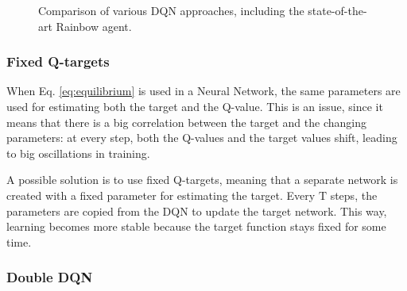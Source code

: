 \documentclass[a4paper, 12pt]{article}
\numberwithin{equation}{section}
\begin{document}
\begin{figure}[h]
	\centering
		\caption{Comparison of various DQN approaches, including the state-of-the-art Rainbow agent.}
	\label{fig:rainbow}
\end{figure}



\subsubsection{Fixed Q-targets}

When Eq. \eqref{eq:equilibrium} is used in a Neural Network, the same parameters are used for estimating both the target and the Q-value. This is an issue, since it means that there is a big correlation between the target and the changing parameters: at every step, both the Q-values and the target values shift, leading to big oscillations in training.

A possible solution is to use fixed Q-targets, meaning that a separate network is created with a fixed parameter for estimating the target. Every $\mathrm{T}$ steps, the parameters are copied from the DQN to update the target network. This way, learning becomes more stable because the target function stays fixed for some time.

\subsubsection{Double DQN}
\end{document}
